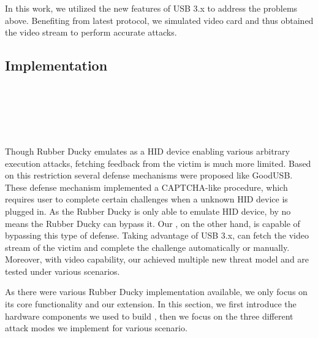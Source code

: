 In this work, we utilized the new features of USB 3.x \cite{usb31} \cite{usb32} to address the problems above.
Benefiting from latest protocol, we simulated video card and thus obtained the video stream to perform accurate attacks.

\subsection{Implementation}
\noindent{}\\
\\
\\
\\
\\
Though Rubber Ducky\cite{rubber} emulates as a HID device enabling various arbitrary execution attacks, fetching feedback from the victim is much more limited. Based on this restriction several defense mechanisms were proposed  like GoodUSB\cite{tian2015defending}. These defense mechanism implemented a CAPTCHA-like\cite{captcha} procedure, which requires user to complete certain challenges when a unknown HID device is plugged in. As the Rubber Ducky is only able to emulate HID device, by no means the Rubber Ducky can bypass it. Our \tool, on the other hand, is capable of bypassing this type of defense. Taking advantage of USB 3.x\cite{usb31}\cite{usb32}, \tool can fetch the video stream of the victim and complete the challenge automatically or manually. Moreover, with video capability, our \tool achieved multiple new threat model and are tested under various scenarios.

As there were various Rubber Ducky implementation available, we only focus on its core functionality and our extension. In this section, we first introduce the hardware components we used to build \tool, then we focus on the three different attack modes we implement  for various scenario.


